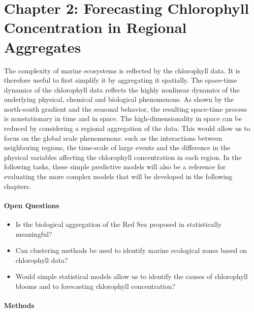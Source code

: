 \section{Chapter 2: Forecasting Chlorophyll Concentration in Regional
Aggregates}

The complexity of marine ecosystems is reflected by the chlorophyll data. 
It is therefore useful to first simplify it
by aggregating it spatially. The space-time dynamics of the chlorophyll data
reflects the highly nonlinear dynamics of the underlying physical, chemical and
biological phenomenons. As shown by the north-south gradient and the seasonal
behavior, the resulting space-time process is nonstationary in time and in
space. The high-dimensionality in space can be reduced by considering a
regional aggregation of the data. This would allow us to focus on the global
scale phenomenons: such as the interactions between neighboring regions, the
time-scale of large events and the difference in the physical variables
affecting the chlorophyll concentration in each region. In the following tasks,
these simple predictive models will also be a reference for evaluating the more
complex models that will be developed in the following chapters.

\paragraph{Open Questions}

\begin{itemize}

\item Is the biological aggregation of the Red Sea proposed in
\citep{Raitsos2013} statistically meaningful?

\item Can clustering methods be used to identify marine ecological zones based
on chlorophyll data?

\item Would simple statistical models allow us to identify the causes of
chlorophyll blooms and to forecasting chlorophyll concentration?

\end{itemize}

\paragraph{Methods}


